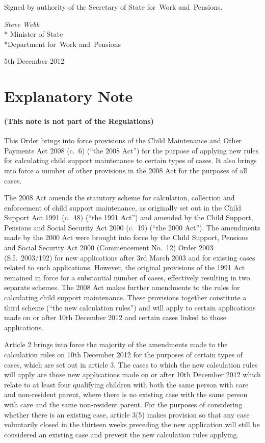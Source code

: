 \documentclass[12pt,a4paper]{article}
\begin{document}
Signed 
by authority of the 
Secretary of State for~Work and~Pensions.

{\raggedleft
\emph{Steve Webb}\\*
Minister
of State\\*Department 
for~Work and~Pensions

}

5th December 2012

\small

\part{Explanatory Note}

\renewcommand\parthead{— Explanatory Note}

\subsection*{(This note is not part of the Regulations)}

This Order brings into force provisions of the Child Maintenance and Other Payments Act 2008 (c.~6) (“the 2008 Act”) for the purpose of applying new rules for calculating child support maintenance to certain types of cases. It also brings into force a number of other provisions in the 2008 Act for the purposes of all cases.

The 2008 Act amends the statutory scheme for calculation, collection and enforcement of child support maintenance, as originally set out in the Child Support Act 1991 (c.~48) (“the 1991 Act”) and amended by the Child Support, Pensions and Social Security Act 2000 (c.~19) (“the 2000 Act”). The amendments made by the 2000 Act were brought into force by the Child Support, Pensions and Social Security Act 2000 (Commencement No.~12) Order 2003 (S.I.~2003/192) for new applications after 3rd March 2003 and for existing cases related to such applications. However, the original provisions of the 1991 Act remained in force for a substantial number of cases, effectively resulting in two separate schemes. The 2008 Act makes further amendments to the rules for calculating child support maintenance. These provisions together constitute a third scheme (“the new calculation rules”) and will apply to certain applications made on or after 10th December 2012 and certain cases linked to those applications.

Article 2 brings into force the majority of the amendments made to the calculation rules on 10th December 2012 for the purposes of certain types of cases, which are set out in article 3. The cases to which the new calculation rules will apply are those new applications made on or after 10th December 2012 which relate to at least four qualifying children with both the same person with care and non-resident parent, where there is no existing case with the same person with care and the same non-resident parent. For the purposes of considering whether there is an existing case, article 3(5) makes provision so that any case voluntarily closed in the thirteen weeks preceding the new application will still be considered an existing case and prevent the new calculation rules applying.
\end{document}

